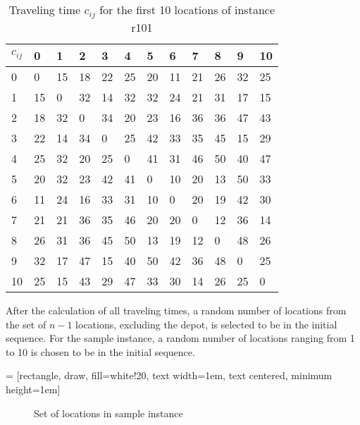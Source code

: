 \documentclass[final,5p,times,twocolumn]{elsarticle}
\begin{document}
{{\renewcommand{\arraystretch}{1.2}
\begin{table}[htbp]
\caption{Traveling time $c_{ij}$ for the first 10 locations of instance r101}
\centering
\begin{tabularx}{\linewidth}{X m{.3cm}m{.3cm}m{.3cm}m{.3cm}m{.3cm}m{.3cm}m{.3cm}m{.3cm}m{.3cm}m{.3cm}m{.3cm}}
\hline 
$c_{ij}$ & 0 & 1 & 2 & 3 & 4 & 5 & 6 & 7 & 8 & 9 & 10\\
\hline
  0& 0& 15& 18& 22& 25& 20& 11& 21& 26& 32& 25\\
  1& 15& 0& 32& 14& 32& 32& 24& 21& 31& 17& 15\\
  2& 18& 32& 0& 34& 20& 23& 16& 36& 36& 47& 43\\
  3& 22& 14& 34& 0& 25& 42& 33& 35& 45& 15& 29\\
  4& 25& 32& 20& 25& 0& 41& 31& 46& 50& 40& 47\\
  5& 20& 32& 23& 42& 41& 0& 10& 20& 13& 50& 33\\
  6& 11& 24& 16& 33& 31& 10& 0& 20& 19& 42& 30\\
  7& 21& 21& 36& 35& 46& 20& 20& 0& 12& 36& 14\\
  8& 26& 31& 36& 45& 50& 13& 19& 12& 0& 48& 26\\
  9& 32& 17& 47& 15& 40& 50& 42& 36& 48& 0& 25\\
  10& 25& 15& 43& 29& 47& 33& 30& 14& 26& 25& 0\\
\hline
\end{tabularx}
\label{tab:cij}
\end{table} 

After the calculation of all traveling times, a random number of locations from the set of $n-1$ locations, excluding the depot, is selected to be in the initial sequence. For the sample instance, a random number of locations ranging from 1 to 10 is chosen to be in the initial sequence. 

 = [rectangle, draw, fill=white!20, 
    text width=1em, text centered, minimum height=1em]

\begin{figure}[htbp]
\centering
{}
\caption{Set of locations in sample instance}
\label{fig:InitSet}
\end{figure}

}}
\end{document}
